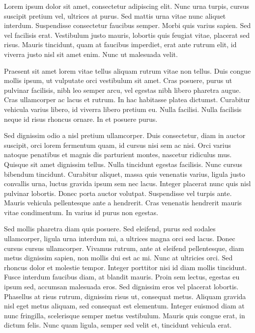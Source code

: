 

Lorem ipsum dolor sit amet, consectetur adipiscing elit. Nunc urna turpis, cursus suscipit pretium vel, ultrices at purus. Sed mattis urna vitae nunc aliquet interdum. Suspendisse consectetur faucibus semper. Morbi quis varius sapien. Sed vel facilisis erat. Vestibulum justo mauris, lobortis quis feugiat vitae, placerat sed risus. Mauris tincidunt, quam at faucibus imperdiet, erat ante rutrum elit, id viverra justo nisl sit amet enim. Nunc ut malesuada velit.

Praesent sit amet lorem vitae tellus aliquam rutrum vitae non tellus. Duis congue mollis ipsum, ut vulputate orci vestibulum sit amet. Cras posuere, purus ut pulvinar facilisis, nibh leo semper arcu, vel egestas nibh libero pharetra augue. Cras ullamcorper ac lacus et rutrum. In hac habitasse platea dictumst. Curabitur vehicula varius libero, id viverra libero pretium eu. Nulla facilisi. Nulla facilisis neque id risus rhoncus ornare. In et posuere purus.

Sed dignissim odio a nisl pretium ullamcorper. Duis consectetur, diam in auctor suscipit, orci lorem fermentum quam, id cursus nisi sem ac nisi. Orci varius natoque penatibus et magnis dis parturient montes, nascetur ridiculus mus. Quisque sit amet dignissim tellus. Nulla tincidunt egestas facilisis. Nunc cursus bibendum tincidunt. Curabitur aliquet, massa quis venenatis varius, ligula justo convallis urna, luctus gravida ipsum sem nec lacus. Integer placerat nunc quis nisl pulvinar lobortis. Donec porta auctor volutpat. Suspendisse vel turpis ante. Mauris vehicula pellentesque ante a hendrerit. Cras venenatis hendrerit mauris vitae condimentum. In varius id purus non egestas.

Sed mollis pharetra diam quis posuere. Sed eleifend, purus sed sodales ullamcorper, ligula urna interdum mi, a ultrices magna orci sed lacus. Donec cursus cursus ullamcorper. Vivamus rutrum, ante at eleifend pellentesque, diam metus dignissim sapien, non mollis dui est ac mi. Nunc at ultricies orci. Sed rhoncus dolor et molestie tempor. Integer porttitor nisi id diam mollis tincidunt. Fusce interdum faucibus diam, at blandit mauris. Proin sem lectus, egestas eu ipsum sed, accumsan malesuada eros. Sed dignissim eros vel placerat lobortis. Phasellus at risus rutrum, dignissim risus ut, consequat metus. Aliquam gravida nisl eget metus aliquam, sed consequat est elementum. Integer euismod diam at nunc fringilla, scelerisque semper metus vestibulum. Mauris quis congue erat, in dictum felis. Nunc quam ligula, semper sed velit et, tincidunt vehicula erat.

